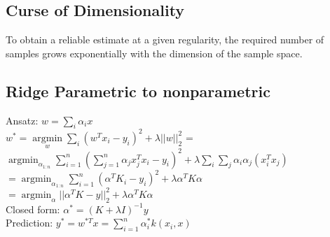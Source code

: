 \subsection*{Curse of Dimensionality}
To obtain a reliable estimate at a given regularity, the required number of samples grows exponentially with the dimension of the sample space.


\subsection*{Ridge Parametric to nonparametric}
Ansatz: $w=\sum_i \alpha_i x$\\
$w^* = \underset{w}{\operatorname{argmin}} \sum_i (w^Tx_i-y_i)^2 + \lambda ||w||_2^2$ = \\
${\operatorname{argmin}}_{\alpha_{1:n}} \sum_{i=1}^n (\sum_{j=1}^n \alpha_j x_j^T x_i - y_i)^2 + \lambda \sum_i \sum_j \alpha_i \alpha_j (x_i^T x_j)$\\
$= {\operatorname{argmin}}_{\alpha_{1:n}} \sum_{i=1}^n (\alpha^T K_i - y_i)^2 + \lambda \alpha^T K \alpha$\\
$= {\operatorname{argmin}}_{\alpha} ||\alpha^T K -y||_2^2 + \lambda \alpha^T K \alpha$\\
Closed form: $\alpha^* = (K+\lambda I)^{-1} y$\\
Prediction: $y^*= w^{*T} x = \sum_{i=1}^n \alpha_i^* k(x_i,x)$